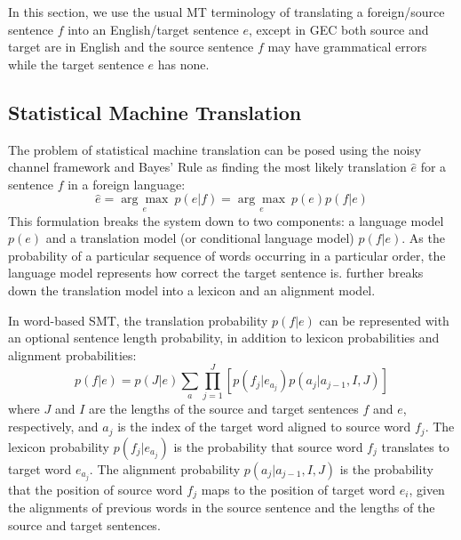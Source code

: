 In this section, we use the usual MT terminology of translating a foreign/source sentence $f$ into an English/target sentence $e$, except in GEC both source and target are in English and the source sentence $f$ may have grammatical errors while the target sentence $e$ has none.

\subsection{Statistical Machine Translation}
The problem of statistical machine translation can be posed using the noisy channel framework and Bayes' Rule as finding the most likely translation $\hat{e}$ for a sentence $f$ in a foreign language:
\begin{equation} \label{eq:bayes}
	\hat{e}=\underset{e}{\arg\!\max}\ p(e|f)=\underset{e}{\arg\!\max}\ p(e)p(f|e)
\end{equation}
This formulation breaks the system down to two components: a language model $p(e)$ and a translation model (or conditional language model) $p(f|e)$. As the probability of a particular sequence of words occurring in a particular order, the language model represents how correct the target sentence is. \citet{Zens2002Phrase-basedTranslation} further breaks down the translation model into a lexicon and an alignment model.

In word-based SMT, the translation probability $p(f|e)$ can be represented with an optional sentence length probability, in addition to lexicon probabilities and alignment probabilities:
\begin{equation} \label{eq:word-based}
	p(f|e)=p(J|e)\sum_{a}\prod_{j=1}^{J}[p(f_j|e_{a_j})p(a_j|a_{j-1},I,J)]
\end{equation}
where $J$ and $I$ are the lengths of the source and target sentences $f$ and $e$, respectively, and $a_j$ is the index of the target word aligned to source word $f_j$. The lexicon probability $p(f_j|e_{a_j})$ is the probability that source word $f_j$ translates to target word $e_{a_j}$. The alignment probability $p(a_j|a_{j-1},I,J)$ is the probability that the position of source word $f_j$ maps to the position of target word $e_i$, given the alignments of previous words in the source sentence and the lengths of the source and target sentences.

